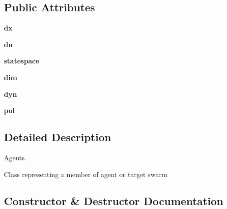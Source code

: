 \subsection*{Public Attributes}
\begin{DoxyCompactItemize}
\item 
\mbox{\label{class_d_o_t__assignment_1_1agents_1_1_agent_ad9e43f826ce7acf69cda999cdf3abd74}} 
{\bfseries dx}
\item 
\mbox{\label{class_d_o_t__assignment_1_1agents_1_1_agent_a1b07dd0fc9dcbd4e60f03dc31f7f38b1}} 
{\bfseries du}
\item 
\mbox{\label{class_d_o_t__assignment_1_1agents_1_1_agent_a993bd0b81ecdecebee66d62cf8d583eb}} 
{\bfseries statespace}
\item 
\mbox{\label{class_d_o_t__assignment_1_1agents_1_1_agent_ae3a8563ff7d4a576aa68a3210ab8e866}} 
{\bfseries dim}
\item 
\mbox{\label{class_d_o_t__assignment_1_1agents_1_1_agent_ae35afbe26e60491eca55678d317dd72d}} 
{\bfseries dyn}
\item 
\mbox{\label{class_d_o_t__assignment_1_1agents_1_1_agent_a920fec108f2b787a988ae361f3d2ddd7}} 
{\bfseries pol}
\end{DoxyCompactItemize}


\subsection{Detailed Description}
Agents. 

\begin{DoxyVerb}Class representing a member of agent or target swarm
\end{DoxyVerb}
 

\subsection{Constructor \& Destructor Documentation}
\mbox{\label{class_d_o_t__assignment_1_1agents_1_1_agent_a243feb66a55d2a2733464276db763fc3}} 
